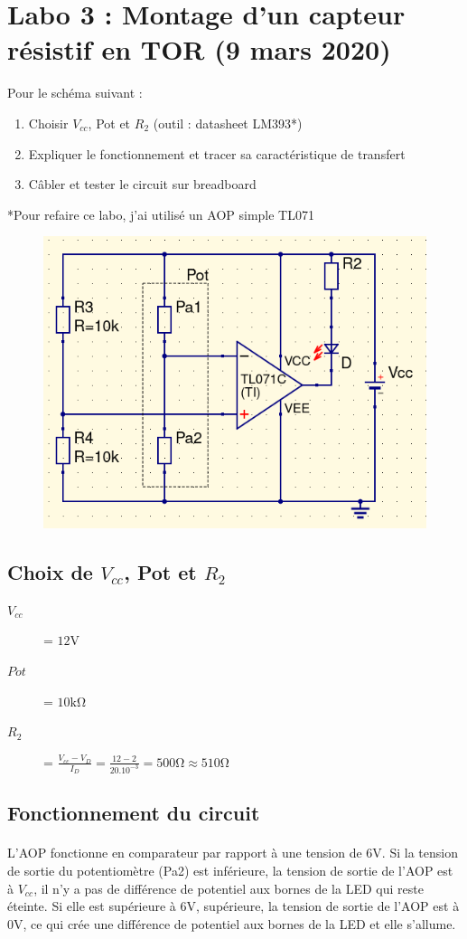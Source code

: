 \documentclass{article}
\begin{document}
\section{Labo 3 : Montage d’un capteur résistif en TOR (9 mars 2020)}
Pour le schéma suivant :
\begin{enumerate}
    \item Choisir $V_{cc}$, Pot et $R_2$ (outil : datasheet LM393*)
    \item Expliquer le fonctionnement et tracer sa caractéristique de transfert
    \item Câbler et tester le circuit sur breadboard
\end{enumerate}
*Pour refaire ce labo, j'ai utilisé un AOP simple TL071
\begin{figure}[H]
    \centering
    \includegraphics[width=.6\linewidth]{images/labo3.png}
\end{figure}

\subsection{Choix de $V_{cc}$, Pot et $R_2$}
\begin{description}
    \item[$V_{cc}$] = $12\si{\volt}$
    \item[$Pot$] = $10\si{\kilo\ohm}$
    \item[$R_2$] = $\frac{V_{cc} - V_D}{I_D} = \frac{12 - 2}{20.10^{-3}} = 500\si{\ohm} \approx 510 \si{\ohm}$
\end{description}

\subsection{Fonctionnement du circuit}
\paragraph{}
L'AOP fonctionne en comparateur par rapport à une tension de 6V. Si la tension de sortie du potentiomètre (Pa2) est inférieure, la tension de sortie de l'AOP est à $V_{cc}$, il n'y a pas de différence de potentiel aux bornes de la LED qui reste éteinte. Si elle est supérieure à 6V, supérieure, la tension de sortie de l'AOP est à 0V, ce qui crée une différence de potentiel aux bornes de la LED et elle s'allume.
\end{document}
